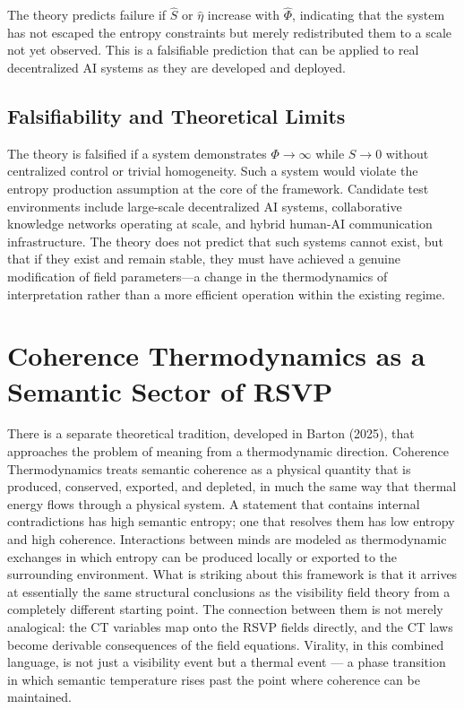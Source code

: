 \documentclass[12pt,a4paper]{article}
\begin{document}
The theory predicts failure if $\hat{S}$ or $\hat{\eta}$ increase with $\hat{\Phi}$, indicating that the system has not escaped the entropy constraints but merely redistributed them to a scale not yet observed. This is a falsifiable prediction that can be applied to real decentralized AI systems as they are developed and deployed.

\subsection{Falsifiability and Theoretical Limits}

The theory is falsified if a system demonstrates $\Phi \rightarrow \infty$ while $S \rightarrow 0$ without centralized control or trivial homogeneity. Such a system would violate the entropy production assumption at the core of the framework. Candidate test environments include large-scale decentralized AI systems, collaborative knowledge networks operating at scale, and hybrid human-AI communication infrastructure. The theory does not predict that such systems cannot exist, but that if they exist and remain stable, they must have achieved a genuine modification of field parameters---a change in the thermodynamics of interpretation rather than a more efficient operation within the existing regime.


\clearpage
\section{Coherence Thermodynamics as a Semantic Sector of RSVP}

There is a separate theoretical tradition, developed in Barton (2025), that approaches the problem of meaning from a thermodynamic direction. Coherence Thermodynamics treats semantic coherence as a physical quantity that is produced, conserved, exported, and depleted, in much the same way that thermal energy flows through a physical system. A statement that contains internal contradictions has high semantic entropy; one that resolves them has low entropy and high coherence. Interactions between minds are modeled as thermodynamic exchanges in which entropy can be produced locally or exported to the surrounding environment. What is striking about this framework is that it arrives at essentially the same structural conclusions as the visibility field theory from a completely different starting point. The connection between them is not merely analogical: the CT variables map onto the RSVP fields directly, and the CT laws become derivable consequences of the field equations. Virality, in this combined language, is not just a visibility event but a thermal event — a phase transition in which semantic temperature rises past the point where coherence can be maintained.
\end{document}
